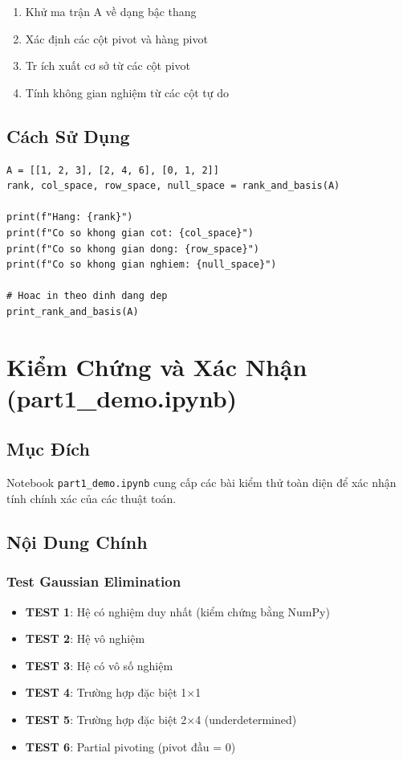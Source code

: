 \documentclass[12pt, a4paper, twoside]{article}
\begin{document}
\begin{enumerate}
    \item Khử ma trận A về dạng bậc thang
    \item Xác định các cột pivot và hàng pivot
    \item Tr ích xuất cơ sở từ các cột pivot
    \item Tính không gian nghiệm từ các cột tự do
\end{enumerate}

\subsection{Cách Sử Dụng}

\begin{lstlisting}
A = [[1, 2, 3], [2, 4, 6], [0, 1, 2]]
rank, col_space, row_space, null_space = rank_and_basis(A)

print(f"Hang: {rank}")
print(f"Co so khong gian cot: {col_space}")
print(f"Co so khong gian dong: {row_space}")
print(f"Co so khong gian nghiem: {null_space}")

# Hoac in theo dinh dang dep
print_rank_and_basis(A)
\end{lstlisting}

\newpage

\section{Kiểm Chứng và Xác Nhận (part1\_demo.ipynb)}

\subsection{Mục Đích}

Notebook \texttt{part1\_demo.ipynb} cung cấp các bài kiểm thử toàn diện để xác nhận tính chính xác của các thuật toán.

\subsection{Nội Dung Chính}

\subsubsection{Test Gaussian Elimination}

\begin{itemize}
    \item \textbf{TEST 1}: Hệ có nghiệm duy nhất (kiểm chứng bằng NumPy)
    \item \textbf{TEST 2}: Hệ vô nghiệm
    \item \textbf{TEST 3}: Hệ có vô số nghiệm
    \item \textbf{TEST 4}: Trường hợp đặc biệt 1×1
    \item \textbf{TEST 5}: Trường hợp đặc biệt 2×4 (underdetermined)
    \item \textbf{TEST 6}: Partial pivoting (pivot đầu = 0)
\end{itemize}
\end{document}
